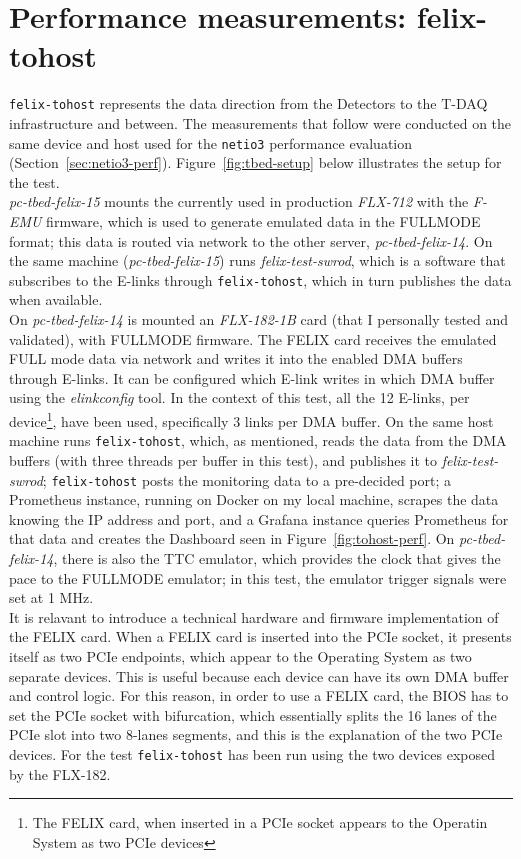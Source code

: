 \section{Performance measurements: felix-tohost}

\texttt{felix-tohost} represents the data direction from the Detectors to the T-DAQ infrastructure and between. The measurements that follow were conducted on the same device and host used for the \texttt{netio3} performance evaluation (Section~\ref{sec:netio3-perf}). 
Figure~\ref{fig:tbed-setup} below illustrates the setup for the test.\\
\emph{pc-tbed-felix-15} mounts the currently used in production \emph{FLX-712} with the \emph{F-EMU} firmware, which is used to generate emulated data in the FULLMODE format; this data is routed via network to the other server, \emph{pc-tbed-felix-14}.
On the same machine (\emph{pc-tbed-felix-15}) runs \emph{felix-test-swrod}, which is a software that subscribes to the \acs{E-link}s through \texttt{felix-tohost}, which in turn publishes the data when available.\\
On \emph{pc-tbed-felix-14} is mounted an \emph{FLX-182-1B} card (that I personally tested and validated), with FULLMODE firmware. The \acs{FELIX} card receives the emulated FULL mode data via network and writes it into the enabled \acs{DMA} buffers through \acs{E-link}s. It can be configured which \acs{E-link} writes in which \acs{DMA} buffer using the \emph{elinkconfig} tool. In the context of this test, all the 12 \acs{E-link}s, per device\footnote{The FELIX card, when inserted in a PCIe socket appears to the Operatin System as two PCIe devices}, have been used, specifically 3 links per \acs{DMA} buffer. On the same host machine runs \texttt{felix-tohost}, which, as mentioned, reads the data from the \acs{DMA} buffers (with three threads per buffer in this test), and publishes it to \emph{felix-test-swrod}; \texttt{felix-tohost} posts the monitoring data to a pre-decided port; a Prometheus instance, running on Docker on my local machine, scrapes the data knowing the IP address and port, and a Grafana instance queries Prometheus for that data and creates the Dashboard seen in Figure~\ref{fig:tohost-perf}. On \emph{pc-tbed-felix-14}, there is also the \acl{TTC} emulator, which provides the clock that gives the pace to the FULLMODE emulator; in this test, the emulator trigger signals were set at 1 MHz.\\
It is relavant to introduce a technical hardware and firmware implementation of the \acs{FELIX} card. When a \acs{FELIX} card is inserted into the \acs{PCIe} socket, it presents itself as two \acs{PCIe} endpoints, which appear to the Operating System as two separate devices. This is useful because each device can have its own \acs{DMA} buffer and control logic. For this reason, in order to use a \acs{FELIX} card, the BIOS has to set the \acs{PCIe} socket with bifurcation, which essentially splits the 16 lanes of the \acs{PCIe} slot into two 8-lanes segments, and this is the explanation of the two \acs{PCIe} devices. For the test \texttt{felix-tohost} has been run using the two devices exposed by the FLX-182.\\
